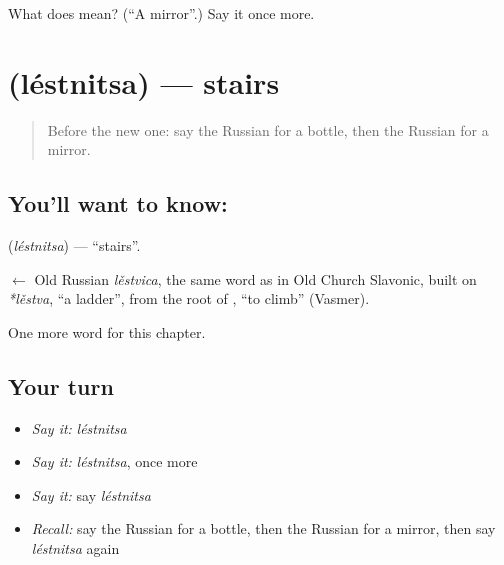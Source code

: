 \begin{tcolorbox}[breakable,colback=teal!4,colframe=teal!35!black,title={Before you move on}]
What does  mean? (\textquotedblleft{}A mirror\textquotedblright{}.) Say it once more.
\end{tcolorbox}
\section[\texorpdfstring{\ru{лестница} (léstnitsa)}{лестница (léstnitsa)}]{ (léstnitsa) — stairs}

\label{lesson:RU-C123-stairs}



\begin{quote}
Before the new one: say the Russian for a bottle, then the Russian for a mirror.
\end{quote}

\subsection*{You'll want to know: }
\textbf{} (\emph{léstnitsa}) — \textquotedblleft{}stairs\textquotedblright{}.

\begin{cousinweb}
\textbf{} $\leftarrow$ Old Russian \emph{lěstvica}, the same word as in Old Church Slavonic, built on \emph{*lěstva}, \textquotedblleft{}a ladder\textquotedblright{}, from the root of \emph{}, \textquotedblleft{}to climb\textquotedblright{} (Vasmer).
\end{cousinweb}

\begin{grammarlens}[title={What you've built}]
One more word for this chapter.
\end{grammarlens}

\subsection*{Your turn}
\begin{itemize}
\raggedright
  \item \emph{Say it:} \emph{léstnitsa}
  \item \emph{Say it:} \emph{léstnitsa}, once more
  \item \emph{Say it:} say \emph{léstnitsa}
  \item \emph{Recall:} say the Russian for a bottle, then the Russian for a mirror, then say \emph{léstnitsa} again
\end{itemize}

